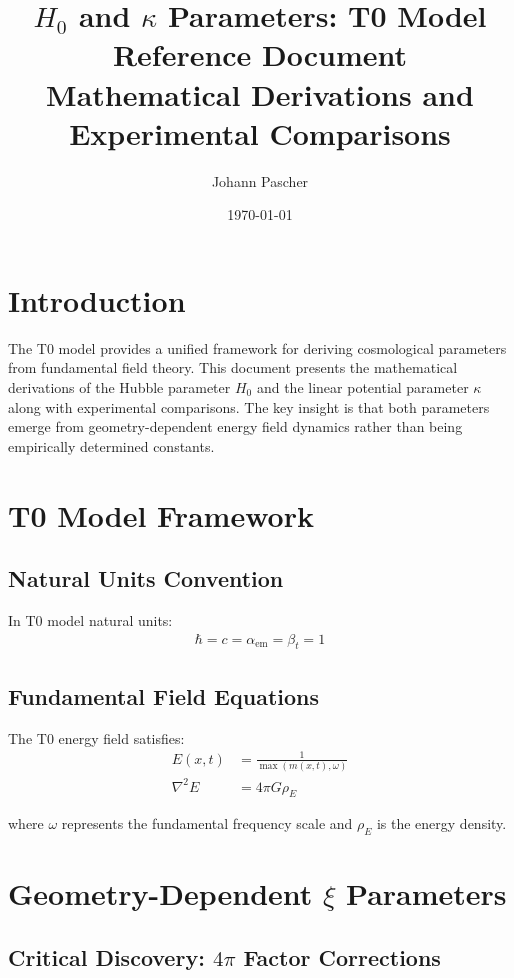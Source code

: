 \documentclass[12pt,a4paper]{article}
\title{$H_0$ and $\kappa$ Parameters: T0 Model Reference Document\\
	\large Mathematical Derivations and Experimental Comparisons}
\author{Johann Pascher}
\date{\today}
\begin{document}
	
	\maketitle
	
	\section{Introduction}
	
	The T0 model provides a unified framework for deriving cosmological parameters from fundamental field theory. This document presents the mathematical derivations of the Hubble parameter $H_0$ and the linear potential parameter $\kappa$ along with experimental comparisons. The key insight is that both parameters emerge from geometry-dependent energy field dynamics rather than being empirically determined constants.
	
	\section{T0 Model Framework}
	
	\subsection{Natural Units Convention}
	In T0 model natural units:
	\begin{align}
		\hbar = c = \alpha_{\text{em}} = \beta_t = 1
	\end{align}
	
	\subsection{Fundamental Field Equations}
	The T0 energy field satisfies:
	\begin{align}
		E(x,t) &= \frac{1}{\max(m(x,t), \omega)} \\
		\nabla^2 E &= 4\pi G \rho_E
	\end{align}
	
	where $\omega$ represents the fundamental frequency scale and $\rho_E$ is the energy density.
	
	\section{Geometry-Dependent $\xi$ Parameters}
	
	\subsection{Critical Discovery: $4\pi$ Factor Corrections}
	
\end{document}
